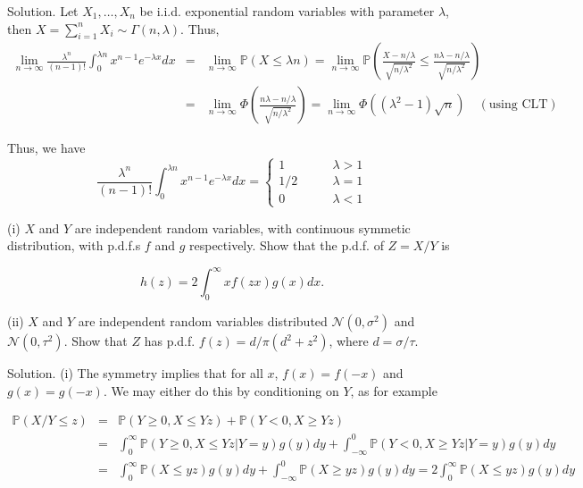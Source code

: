 Solution. Let $X_1,\dots,X_n$ be i.i.d. exponential random variables with parameter $\lambda$, then $X=\sum^n_{i=1}X_i\sim\Gamma(n,\lambda)$. Thus,
\begin{eqnarray}
\lim_{n\to\infty} \frac{\lambda^n}{(n-1)!}\int^{\lambda n}_0x^{n-1}e^{-\lambda x}dx & = & \lim_{n\to\infty} \mathbb{P}(X \leq \lambda n) = \lim_{n\to\infty} \mathbb{P}\left(\frac{X-n/\lambda}{\sqrt{n/\lambda^2}} \leq \frac{n\lambda-n/\lambda}{\sqrt{n/\lambda^2}} \right) \nonumber\\
& = & \lim_{n\to\infty}\Phi\left(\frac{n\lambda-n/\lambda}{\sqrt{n/\lambda^2}}\right) = \lim_{n\to\infty}\Phi\left((\lambda^2-1)\sqrt{n}\right)\quad (\text{using CLT})
\end{eqnarray} 

Thus, we have 
\begin{equation}
\frac{\lambda^n}{(n-1)!}\int^{\lambda n}_0x^{n-1}e^{-\lambda x}dx =\left\{
\begin{array}{ll}
1 & \lambda>1\\
1/2 \quad \quad & \lambda = 1 \\
0 & \lambda <1
\end{array}
\right.
\end{equation} 


\item (i) $X$ and $Y$ are independent random variables, with continuous symmetic distribution, with p.d.f.s $f$ and $g$ respectively. Show that the p.d.f. of $Z=X/Y$ is 

\begin{equation}
h(z) = 2\int^\infty_0 xf(zx)g(x)dx.
\end{equation} 

(ii) $X$ and $Y$ are independent random variables distributed $\mathcal{N}(0,\sigma^2)$ and $\mathcal{N}(0,\tau^2)$. Show that $Z$ has p.d.f. $f(z)=d/\pi(d^2+z^2)$, where $d=\sigma/\tau$.



Solution. (i) The symmetry implies that for all $x$, $f(x)=f(-x)$ and $g(x)=g(-x)$. We may either do this by conditioning on $Y$, as for example

\begin{eqnarray}
\mathbb{P}(X/Y\leq z) & = & \mathbb{P}(Y\geq 0, X\leq Yz) + \mathbb{P}(Y< 0, X\geq Yz) \nonumber\\
 & = & \int^\infty_0 \mathbb{P}(Y\geq 0, X\leq Yz|Y=y)g(y)dy  +  \int_{-\infty}^0 \mathbb{P}(Y< 0, X\geq Yz|Y=y)g(y)dy \nonumber\\
 & = & \int^\infty_0 \mathbb{P}(X\leq yz)g(y)dy  +  \int_{-\infty}^0 \mathbb{P}(X\geq yz)g(y)dy = 2\int^\infty_0 \mathbb{P}(X\leq yz)g(y)dy
\end{eqnarray}

